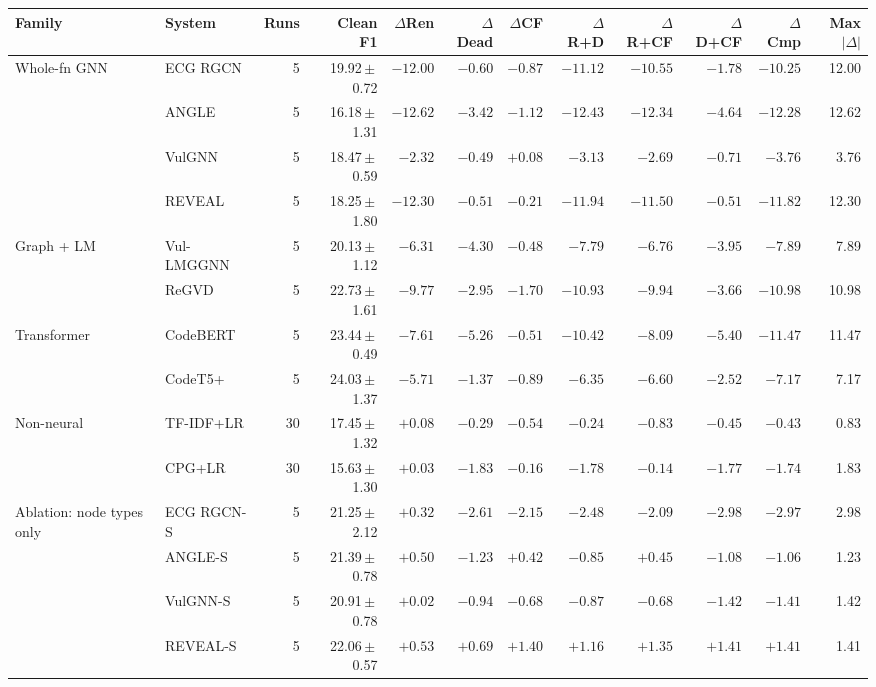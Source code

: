 \begin{tabular}{llrrrrrrrrrr}
\toprule
Family & System & Runs & Clean F1 & $\Delta$Ren & $\Delta$Dead & $\Delta$CF & $\Delta$R+D & $\Delta$R+CF & $\Delta$D+CF & $\Delta$Cmp & Max$|\Delta|$ \\
\midrule
Whole-fn GNN & ECG RGCN & 5 & 19.92\,$\pm$\,0.72 & $\mathbf{-12.00}$ & $-0.60$ & $\mathbf{-0.87}$ & $\mathbf{-11.12}$ & $\mathbf{-10.55}$ & $\mathbf{-1.78}$ & $\mathbf{-10.25}$ & 12.00 \\
 & ANGLE & 5 & 16.18\,$\pm$\,1.31 & $\mathbf{-12.62}$ & $-3.42$ & $-1.12$ & $\mathbf{-12.43}$ & $\mathbf{-12.34}$ & $-4.64$ & $\mathbf{-12.28}$ & 12.62 \\
 & VulGNN & 5 & 18.47\,$\pm$\,0.59 & $\mathbf{-2.32}$ & $-0.49$ & $+0.08$ & $-3.13$ & $-2.69$ & $-0.71$ & $-3.76$ & 3.76 \\
 & REVEAL & 5 & 18.25\,$\pm$\,1.80 & $\mathbf{-12.30}$ & $-0.51$ & $-0.21$ & $\mathbf{-11.94}$ & $\mathbf{-11.50}$ & $-0.51$ & $\mathbf{-11.82}$ & 12.30 \\
\midrule
Graph + LM & Vul-LMGGNN & 5 & 20.13\,$\pm$\,1.12 & $\mathbf{-6.31}$ & $\mathbf{-4.30}$ & $-0.48$ & $\mathbf{-7.79}$ & $\mathbf{-6.76}$ & $\mathbf{-3.95}$ & $\mathbf{-7.89}$ & 7.89 \\
 & ReGVD & 5 & 22.73\,$\pm$\,1.61 & $\mathbf{-9.77}$ & $\mathbf{-2.95}$ & $\mathbf{-1.70}$ & $\mathbf{-10.93}$ & $\mathbf{-9.94}$ & $\mathbf{-3.66}$ & $\mathbf{-10.98}$ & 10.98 \\
\midrule
Transformer & CodeBERT & 5 & 23.44\,$\pm$\,0.49 & $\mathbf{-7.61}$ & $\mathbf{-5.26}$ & $-0.51$ & $\mathbf{-10.42}$ & $\mathbf{-8.09}$ & $\mathbf{-5.40}$ & $\mathbf{-11.47}$ & 11.47 \\
 & CodeT5+ & 5 & 24.03\,$\pm$\,1.37 & $\mathbf{-5.71}$ & $-1.37$ & $-0.89$ & $\mathbf{-6.35}$ & $\mathbf{-6.60}$ & $\mathbf{-2.52}$ & $\mathbf{-7.17}$ & 7.17 \\
\midrule
Non-neural & TF-IDF+LR & 30 & 17.45\,$\pm$\,1.32 & $+0.08$ & $-0.29$ & $-0.54$ & $-0.24$ & $-0.83$ & $-0.45$ & $-0.43$ & 0.83 \\
 & CPG+LR & 30 & 15.63\,$\pm$\,1.30 & $+0.03$ & $-1.83$ & $-0.16$ & $-1.78$ & $-0.14$ & $-1.77$ & $-1.74$ & 1.83 \\
\midrule
Ablation: node types only & ECG RGCN-S & 5 & 21.25\,$\pm$\,2.12 & $+0.32$ & $-2.61$ & $-2.15$ & $-2.48$ & $-2.09$ & $-2.98$ & $-2.97$ & 2.98 \\
 & ANGLE-S & 5 & 21.39\,$\pm$\,0.78 & $\mathbf{+0.50}$ & $\mathbf{-1.23}$ & $+0.42$ & $-0.85$ & $+0.45$ & $-1.08$ & $-1.06$ & 1.23 \\
 & VulGNN-S & 5 & 20.91\,$\pm$\,0.78 & $+0.02$ & $\mathbf{-0.94}$ & $-0.68$ & $\mathbf{-0.87}$ & $-0.68$ & $\mathbf{-1.42}$ & $\mathbf{-1.41}$ & 1.42 \\
 & REVEAL-S & 5 & 22.06\,$\pm$\,0.57 & $\mathbf{+0.53}$ & $+0.69$ & $\mathbf{+1.40}$ & $+1.16$ & $\mathbf{+1.35}$ & $\mathbf{+1.41}$ & $\mathbf{+1.41}$ & 1.41 \\
\bottomrule
\end{tabular}
